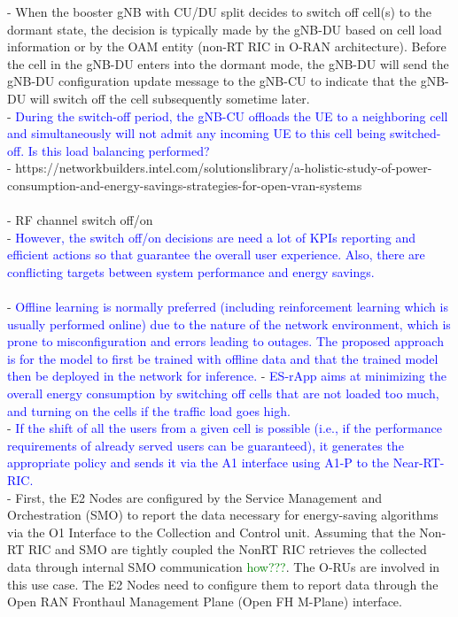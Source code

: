 \documentclass[conference]{IEEEtran}
\begin{document}
- When the booster gNB with CU/DU split decides to switch off cell(s) to the dormant state, the decision is typically made by the gNB-DU based on cell load information or by the OAM entity (non-RT RIC in O-RAN architecture). Before the cell in the gNB-DU enters into the dormant mode, the gNB-DU will send the gNB-DU configuration update message to the gNB-CU to indicate that the gNB-DU will switch off the cell subsequently sometime later. \\ 
- \textcolor{blue}{During the switch-off period, the gNB-CU offloads the UE to a neighboring cell and simultaneously will not admit any incoming UE to this cell being switched-off. Is this load balancing performed?}\\
- https://networkbuilders.intel.com/solutionslibrary/a-holistic-study-of-power-consumption-and-energy-savings-strategies-for-open-vran-systems \\ 
\\
- RF channel switch off/on \\
- \textcolor{blue}{However, the switch off/on decisions are need a lot of KPIs reporting and efficient actions so that guarantee the overall user experience. Also, there are conflicting targets between system performance and energy savings.} \\
\\
- \textcolor{blue}{Offline learning is normally preferred (including reinforcement learning which is usually performed online) due to the nature of the network environment, which is prone to misconfiguration and errors leading to outages. The proposed approach is for the model to first be trained with offline data and that the trained model then be deployed in the network for inference.} 
- \textcolor{blue}{ES-rApp aims at minimizing the overall energy consumption by switching off cells that are not loaded too much, and turning on the cells if the traffic load goes high.}\\
- \textcolor{blue}{If the shift of all the users from a given cell is possible (i.e., if the performance requirements of already served users can be guaranteed), it generates the appropriate policy and sends it via the A1 interface using A1-P to the Near-RT-RIC.} \\
- First, the E2 Nodes are configured by the Service Management and Orchestration (SMO) to report the data necessary for energy-saving algorithms via the O1 Interface to the Collection and Control unit. Assuming that the Non-RT RIC and SMO are tightly coupled the NonRT RIC retrieves the collected data through internal SMO communication \textcolor{green}{how???}. The O-RUs are involved in this use case. The E2 Nodes need to configure them to report data through the Open RAN Fronthaul Management Plane (Open FH M-Plane) interface.\\
\end{document}
